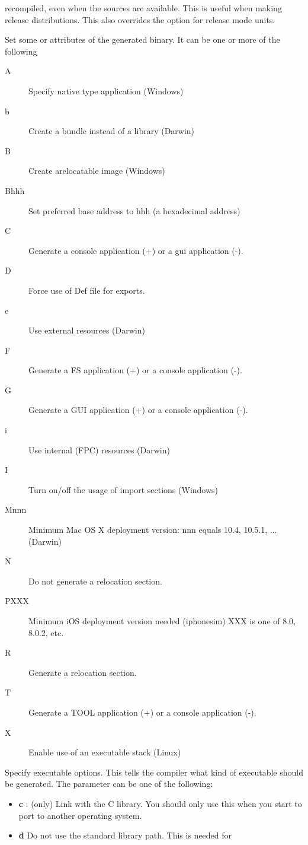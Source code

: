\begin{description}
recompiled, even when the sources are available. This is useful when making
release distributions. This also overrides the  option for release
mode units.
\item[-W] Set some \windows or \ostwo attributes of the generated binary. It
can be one or more of the following
\begin{description}
\item[A] Specify native type application (Windows)
\item[b] Create a bundle instead of a library (Darwin)
\item[B] Create arelocatable image (Windows)
\item[Bhhh] Set preferred base address to hhh (a hexadecimal address)
\item[C] Generate a console application (+) or a gui application (-).
\item[D] Force use of Def file for exports.
\item[e] Use external resources (Darwin)
\item[F] Generate a FS application (+) or a console application (-).
\item[G] Generate a GUI application (+) or a console application (-).
\item[i] Use internal (FPC) resources (Darwin)
\item[I] Turn on/off the usage of import sections (Windows)
\item[Mnnn] Minimum Mac OS X deployment version: nnn equals 10.4, 10.5.1, ... (Darwin)
\item[N] Do not generate a relocation section.
\item[PXXX] Minimum iOS deployment version needed (iphonesim) XXX is one of 8.0, 8.0.2, etc.
\item[R] Generate a relocation section.
\item[T] Generate a TOOL application (+) or a console application (-).
\item[X] Enable use of an executable stack (Linux)
\end{description}
\item [-Xx]  Specify executable options. This tells the compiler what
kind of executable should be generated. The parameter 
can be one of the following:
\begin{itemize}
\item \textbf{c} : (\linux only) Link with the C library. You should only use this when
  you start to port \fpc to another operating system. 
\item \textbf{d} Do not use the standard library path. This is needed for

\end{itemize}
\end{description}
